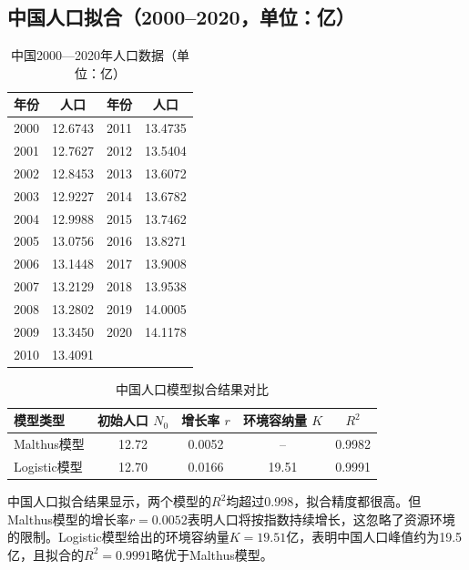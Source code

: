 \documentclass{article}
\begin{document}
	\subsection{中国人口拟合（2000--2020，单位：亿）}
	
	\begin{table}[htbp]
		\centering
		\caption{中国2000—2020年人口数据（单位：亿）}
		\renewcommand{\arraystretch}{1.2}
		\renewcommand{\heavyrulewidth}{1.2pt}
		\setlength{\tabcolsep}{3em}
		\begin{tabular}{cccc}
			\toprule
			年份 & 人口 & 年份 & 人口 \\
			\midrule
			2000 & 12.6743 & 2011 & 13.4735 \\
			2001 & 12.7627 & 2012 & 13.5404 \\
			2002 & 12.8453 & 2013 & 13.6072 \\
			2003 & 12.9227 & 2014 & 13.6782 \\
			2004 & 12.9988 & 2015 & 13.7462 \\
			2005 & 13.0756 & 2016 & 13.8271 \\
			2006 & 13.1448 & 2017 & 13.9008 \\
			2007 & 13.2129 & 2018 & 13.9538 \\
			2008 & 13.2802 & 2019 & 14.0005 \\
			2009 & 13.3450 & 2020 & 14.1178 \\
			2010 & 13.4091 &  &  \\
			\bottomrule
		\end{tabular}
		\renewcommand{\heavyrulewidth}{0.8pt}
	\end{table}
	
	\begin{table}[htbp]
		\centering
		\setlength{\tabcolsep}{8pt}
		\renewcommand{\arraystretch}{1.3}
		\caption{中国人口模型拟合结果对比}
		\label{tab:chn_pop_fit}
		\begin{tabular}{lcccc}
			\toprule
			\textbf{模型类型} & \textbf{初始人口 }\(N_0\) & \textbf{增长率 }\(r\) & \textbf{环境容纳量 }\(K\) & \textbf{\(R^2\)} \\
			\midrule
			Malthus模型 & 12.72 & 0.0052 & -- & 0.9982 \\
			Logistic模型 & 12.70 & 0.0166 & 19.51 & 0.9991 \\
			\bottomrule
		\end{tabular}
	\end{table}
	
	中国人口拟合结果显示，两个模型的\(R^2\)均超过0.998，拟合精度都很高。但Malthus模型的增长率\(r=0.0052\)表明人口将按指数持续增长，这忽略了资源环境的限制。Logistic模型给出的环境容纳量\(K=19.51\)亿，表明中国人口峰值约为19.5亿，且拟合的\(R^2=0.9991\)略优于Malthus模型。
	
\end{document}
